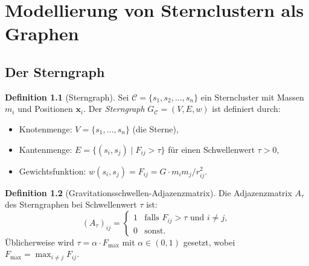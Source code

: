 ﻿\documentclass[a4paper,12pt]{report}
\theoremstyle{definition}
\newtheorem{definition}{Definition}
\begin{document}
\chapter{Modellierung von Sternclustern als Graphen}

\section{Der Sterngraph}

\begin{definition}[Sterngraph]
Sei $\mathcal{C} = \{s_1, s_2, \ldots, s_n\}$ ein Sterncluster mit Massen $m_i$ und Positionen $\mathbf{x}_i$. Der \emph{Sterngraph} $G_\mathcal{C} = (V, E, w)$ ist definiert durch:
\begin{itemize}
    \item Knotenmenge: $V = \{s_1, \ldots, s_n\}$ (die Sterne),
    \item Kantenmenge: $E = \{(s_i, s_j) \mid F_{ij} > \tau\}$ für einen Schwellenwert $\tau > 0$,
    \item Gewichtsfunktion: $w(s_i, s_j) = F_{ij} = G \cdot m_i m_j / r_{ij}^2$.
\end{itemize}
\end{definition}

\begin{definition}[Gravitationsschwellen-Adjazenzmatrix]
Die Adjazenzmatrix $A_\tau$ des Sterngraphen bei Schwellenwert $\tau$ ist:
\[
(A_\tau)_{ij} = \begin{cases}
    1 & \text{falls } F_{ij} > \tau \text{ und } i \neq j, \\
    0 & \text{sonst.}
\end{cases}
\]
Üblicherweise wird $\tau = \alpha \cdot F_\mathrm{max}$ mit $\alpha \in (0, 1)$ gesetzt, wobei $F_\mathrm{max} = \max_{i \neq j} F_{ij}$.
\end{definition}
\end{document}
